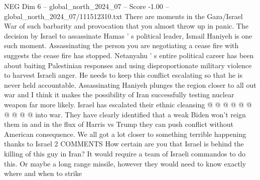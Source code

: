 \begin{textsample}{NEG Dim 6 – global\_north\_2024\_07 – Score -1.00 – global\_north\_2024\_07/111512310.txt}
There are moments in the Gaza/Israel War of such barbarity and provocation that you almost throw up in panic.
The decision by Israel to assassinate Hamas ' s political leader, Ismail Haniyeh is one such moment.
Assassinating the person you are negotiating a cease fire with suggests the cease fire has stopped.
Netanyahu ' s entire political career has been about baiting Palestinian responses and using disproportionate military violence to harvest Israeli anger.
He needs to keep this conflict escalating so that he is never held accountable.
Assassinating Haniyeh plunges the region closer to all out war and I think it makes the possibility of Iran successfully testing nuclear weapon far more likely.
Israel has escalated their ethnic cleansing @ @ @ @ @ @ @ @ @ @ into war.
They have clearly identified that a weak Biden won't reign them in and in the flux of Harris vs Trump they can push conflict without American consequence.
We all got a lot closer to something terrible happening thanks to Israel 2 COMMENTS How certain are you that Israel is behind the killing of this guy in Iran?
It would require a team of Israeli commandos to do this.
Or maybe a long range missile, however they would need to know exactly where and when to strike

\end{textsample}
